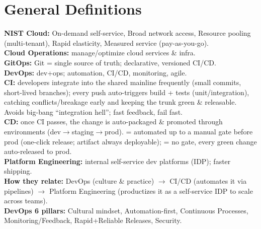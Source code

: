 \section{General Definitions}
\textbf{NIST Cloud:} On-demand self-service, Broad network access, Resource pooling (multi-tenant), Rapid elasticity, Measured service (pay-as-you-go). \\
\textbf{Cloud Operations:} manage/optimize cloud services \& infra. \\
\textbf{GitOps:} Git = single source of truth; declarative, versioned CI/CD. \\
\textbf{DevOps:} dev+ops; automation, CI/CD, monitoring, agile. \\
\textbf{CI:} developers integrate into the shared mainline frequently (small commits, short-lived branches); every push auto-triggers build + tests (unit/integration), catching conflicts/breakage early and keeping the trunk green \& releasable. Avoids big-bang ``integration hell''; fast feedback, fail fast. \\
\textbf{CD:} once CI passes, the change is auto-packaged \& promoted through environments (dev$\to$staging$\to$prod).  = automated up to a manual gate before prod (one-click release; artifact always deployable);  = no gate, every green change auto-released to prod. \\
\textbf{Platform Engineering:} internal self-service dev platforms (IDP); faster shipping. \\
\textbf{How they relate:} DevOps (culture \& practice) $\to$ CI/CD (automates it via pipelines) $\to$ Platform Engineering (productizes it as a self-service IDP to scale across teams). \\
\textbf{DevOps 6 pillars:} Cultural mindset, Automation-first, Continuous Processes, Monitoring/Feedback, Rapid+Reliable Releases, Security.

